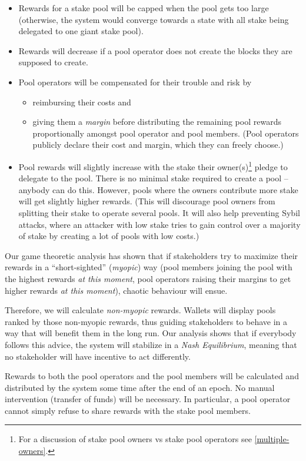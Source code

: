 \documentclass[11pt,a4paper,dvipsnames,twosided]{article}
\begin{document}
\begin{itemize}
\item
  Rewards for a stake pool will be capped when the pool gets too large
  (otherwise, the system would converge towards a state with all stake
  being delegated to one giant stake pool).
\item
  Rewards will decrease if a pool operator does not create the blocks they
  are supposed to create.
\item
  Pool operators will be compensated for their trouble and risk by
  \begin{itemize}
  \item
    reimbursing their costs and
  \item
    giving them a \emph{margin} before distributing the remaining pool rewards
    proportionally amongst pool operator and pool members. (Pool operators
    publicly declare their cost and margin, which they can freely choose.)
  \end{itemize}
\item
  Pool rewards will slightly increase with the stake their owner(s)\footnote{For
    a discussion of stake pool owners vs stake pool operators see
    \cref{multiple-owners}.} pledge to delegate to the pool. There is no minimal
  stake required to create a pool -- anybody can do this. However, pools where
  the owners contribute more stake will get slightly higher rewards. (This will
  discourage pool owners from splitting their stake to operate several pools. It
  will also help preventing Sybil attacks, where an attacker with low stake
  tries to gain control over a majority of stake by creating a lot of pools with
  low costs.)
\end{itemize}

Our game theoretic analysis has shown that if stakeholders try to
maximize their rewards in a ``short-sighted'' (\emph{myopic}) way (pool
members joining the pool with the highest rewards \emph{at this moment},
pool operators raising their margins to get higher rewards \emph{at this
moment}), chaotic behaviour will ensue.

Therefore, we will calculate \emph{non-myopic} rewards. Wallets will display
pools ranked by those non-myopic rewards, thus guiding stakeholders to behave in
a way that will benefit them in the long run. Our analysis shows that if
everybody follows this advice, the system will stabilize in a \emph{Nash
  Equilibrium}, meaning that no stakeholder will have incentive to act
differently.

Rewards to both the pool operators and the pool members will be calculated and
distributed by the system some time after the end of an epoch. No manual
intervention (transfer of funds) will be necessary. In particular, a pool
operator cannot simply refuse to share rewards with the stake pool members.
\end{document}
